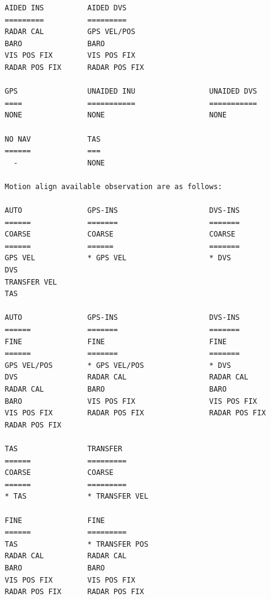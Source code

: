 \begin{frame}
\begin{verbatim}
     AIDED INS          AIDED DVS
     =========          =========
     RADAR CAL          GPS VEL/POS
     BARO               BARO
     VIS POS FIX        VIS POS FIX
     RADAR POS FIX      RADAR POS FIX

     GPS                UNAIDED INU                 UNAIDED DVS
     ====               ===========                 ===========
     NONE               NONE                        NONE

     NO NAV             TAS
     ======             ===
       -                NONE

     Motion align available observation are as follows:

     AUTO               GPS-INS                     DVS-INS
     ======             =======                     =======
     COARSE             COARSE                      COARSE
     ======             ======                      =======
     GPS VEL            * GPS VEL                   * DVS
     DVS
     TRANSFER VEL
     TAS

     AUTO               GPS-INS                     DVS-INS
     ======             =======                     =======
     FINE               FINE                        FINE
     ======             =======                     =======
     GPS VEL/POS        * GPS VEL/POS               * DVS
     DVS                RADAR CAL                   RADAR CAL
     RADAR CAL          BARO                        BARO
     BARO               VIS POS FIX                 VIS POS FIX
     VIS POS FIX        RADAR POS FIX               RADAR POS FIX
     RADAR POS FIX

     TAS                TRANSFER
     ======             =========
     COARSE             COARSE
     ======             =========
     * TAS              * TRANSFER VEL

     FINE               FINE
     ======             =========
     TAS                * TRANSFER POS
     RADAR CAL          RADAR CAL
     BARO               BARO
     VIS POS FIX        VIS POS FIX
     RADAR POS FIX      RADAR POS FIX

\end{verbatim}
\end{frame}
